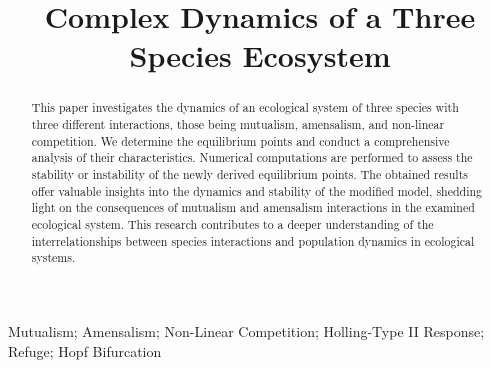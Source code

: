 \documentclass[]{interact}
\theoremstyle{plain}%
\theoremstyle{definition}
\theoremstyle{remark}
\numberwithin{equation}{section}
\begin{document}
\articletype{}%

\title{Complex Dynamics of a Three Species Ecosystem}

\author{
}

\maketitle

\begin{abstract}
This paper investigates the dynamics of an ecological system of three species with three different interactions, those being mutualism, amensalism, and non-linear competition. We determine the equilibrium points and conduct a comprehensive analysis of their characteristics. Numerical computations are performed to assess the stability or instability of the newly derived equilibrium points. The obtained results offer valuable insights into the dynamics and stability of the modified model, shedding light on the consequences of mutualism and amensalism interactions in the examined ecological system. This research contributes to a deeper understanding of the interrelationships between species interactions and population dynamics in ecological systems.
\end{abstract}

\begin{keywords}
Mutualism; Amensalism; Non-Linear Competition; Holling-Type II Response; Refuge; Hopf Bifurcation
\end{keywords}













\newpage
\appendix

\end{document}
